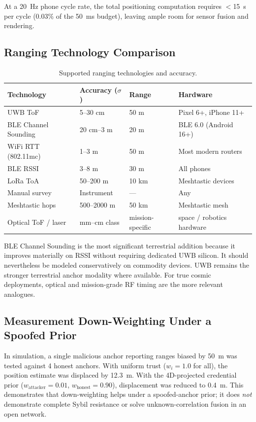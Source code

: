 \documentclass[12pt,a4paper]{article}
\begin{document}
At a 20~Hz phone cycle rate, the total positioning computation requires $<$15~\textmu s per cycle (0.03\% of the 50~ms budget), leaving ample room for sensor fusion and rendering.

\subsection{Ranging Technology Comparison}

\begin{table}[h]
\centering
\caption{Supported ranging technologies and accuracy.}
\label{tab:ranging}
\begin{tabular}{@{}llll@{}}
\toprule
\textbf{Technology} & \textbf{Accuracy ($\sigma$)} & \textbf{Range} & \textbf{Hardware} \\
\midrule
UWB ToF              & 5--30 cm      & 50 m   & Pixel 6+, iPhone 11+ \\
BLE Channel Sounding & 20 cm--3 m    & 20 m   & BLE 6.0 (Android 16+) \\
WiFi RTT (802.11mc)  & 1--3 m        & 50 m   & Most modern routers \\
BLE RSSI             & 3--8 m        & 30 m   & All phones \\
LoRa ToA             & 50--200 m     & 10 km  & Meshtastic devices \\
Manual survey        & Instrument    & ---    & Any \\
Meshtastic hops      & 500--2000 m   & 50 km  & Meshtastic mesh \\
Optical ToF / laser  & mm--cm class  & mission-specific & space / robotics hardware \\
\bottomrule
\end{tabular}
\end{table}

BLE Channel Sounding is the most significant terrestrial addition because it improves materially on RSSI without requiring dedicated UWB silicon. It should nevertheless be modeled conservatively on commodity devices. UWB remains the stronger terrestrial anchor modality where available. For true cosmic deployments, optical and mission-grade RF timing are the more relevant analogues.

\subsection{Measurement Down-Weighting Under a Spoofed Prior}

In simulation, a single malicious anchor reporting ranges biased by 50~m was tested against 4 honest anchors. With uniform trust ($w_i = 1.0$ for all), the position estimate was displaced by 12.3~m. With the 4D-projected credential prior ($w_{\text{attacker}} = 0.01$, $w_{\text{honest}} = 0.90$), displacement was reduced to 0.4~m. This demonstrates that down-weighting helps under a spoofed-anchor prior; it does \emph{not} demonstrate complete Sybil resistance or solve unknown-correlation fusion in an open network.
\end{document}
